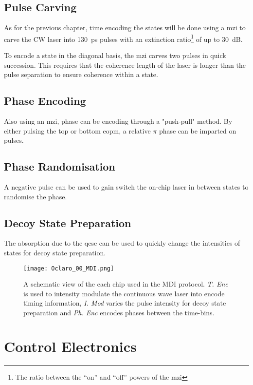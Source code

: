 \subsection{Pulse Carving}

As for the previous chapter, time encoding the states will be done using a \acl{mzi} to carve the \ac{CW} laser into \SI{130}{ps} pulses with an extinction ratio\footnote{The ratio between the ``on'' and ``off'' powers of the \ac{mzi}} of up to \SI{30}{dB}.

To encode a state in the diagonal basis, the \ac{mzi} carves two pulses in quick succession. This requires that the coherence length of the laser is longer than the pulse separation to ensure coherence within a state. 

\subsection{Phase Encoding}

Also using an \ac{mzi}, phase can be encoding through a "push-pull" method. By either pulsing the top or bottom \ac{eopm}, a relative $\pi$ phase can be imparted on pulses.

\subsection{Phase Randomisation}

A negative pulse can be used to gain switch the on-chip laser in between states to randomise the phase. 

\subsection{Decoy State Preparation}

The absorption due to the \ac{qcse} can be used to quickly change the intensities of states for decoy state preparation.

\begin{figure}[tbp]
	\texttt{[image: Oclaro\_00\_MDI.png]}
	\caption[InP transmitter schematic]{A schematic view of the each chip used in the \ac{MDI} protocol. \textit{T. Enc} is used to intensity modulate the continuous wave laser into encode timing information, \textit{I. Mod} varies the pulse intensity for decoy state preparation and \textit{Ph. Enc} encodes phases between the time-bins.}
	\label{fig:chip_mdi_schematic}
\end{figure}

\section{Control Electronics}

